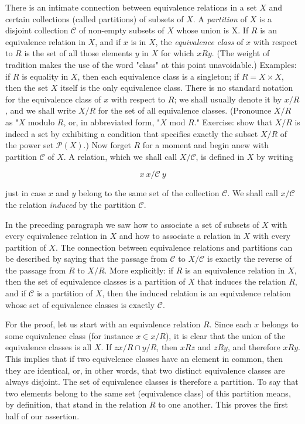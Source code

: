 There is an intimate connection between equivalence relations in a set $X$ and certain collections (called partitions) of subsets of $X$. A \textit{partition} of $X$ is a disjoint collection $ \mathcal{C} $ of non-empty subsets of $X$ whose union is X. If $R$ is an equivalence relation in $X$, and if $x$ is in $X$, the \textit{equivalence class} of $x$ with respect to $R$ is the set of all those elements $y$ in $X$ for which $x R y$. (The weight of tradition makes the use of the word "class" at this point unavoidable.) Examples: if $ R$ is equality in $X$, then each equivalence class is a singleton; if $R =  X \times X$, then the set $X$ itself is the only equivalence class. There is no standard notation for the equivalence class of $x$ with respect to $R$; we shall usually denote it by $x/ R$, and we shall write $X/ R$ for the set of all equivalence classes. (Pronounce $X/ R$ as "$X$ modulo $R$, or, in abbreviated form, "$X$ mod $R$." Exercise: show that $X/ R$ is indeed a set by exhibiting a condition that specifies exactly the subset $X/ R$ of the power set $\mathcal{P}(X)$.) Now forget $R$ for a moment and begin anew with partition $\mathcal{C}$ of $X$. A relation, which we shall call $X/ \mathcal{C}$, is defined in $X$ by writing

\begin{equation*}
x \: x/ \mathcal{C} \: y
\end{equation*}

just in case $x$ and $y$ belong to the same set of the collection $\mathcal{C}$. We shall call $x/ \mathcal{C}$ the relation \textit{induced} by the partition $\mathcal{C}$.

In the preceding paragraph we saw how to associate a set of subsets of $X$ with every equivalence relation in $X$ and how to associate a relation in $X$ with every partition of $X$. The connection between equivalence relations and partitions can be described by saying that the passage from $\mathcal{C}$ to $X/ \mathcal{C}$ is exactly the reverse of the passage from $R$ to $X/ R$. More explicitly: if $R$ is an equivalence relation in $X$, then the set of equivalence classes is a partition of $X$ that induces the relation $R$, and if $\mathcal{C}$ is a partition of $X$, then the induced relation is an equivalence relation whose set of equivalence classes is exactly $\mathcal{C}$. 

For the proof, let us start with an equivalence relation $R$. Since each $x$ belongs to some equivalence class (for instance $x \in x/ R$), it is clear that the union of the equivalence classes is all $X$. If $z x/ R \cap y/ R$, then $x R z$ and $z R y$, and therefore $x R y$. This implies that if two equivelence classes have an element in common, then they are identical, or, in other words, that two distinct  equivalence classes are always disjoint. The set  of equivalence classes is therefore a partition. To say that two elements belong to the same set (equivalence class) of this partition means, by definition, that stand in the relation $R$ to one another. This proves the first half of our assertion. 

